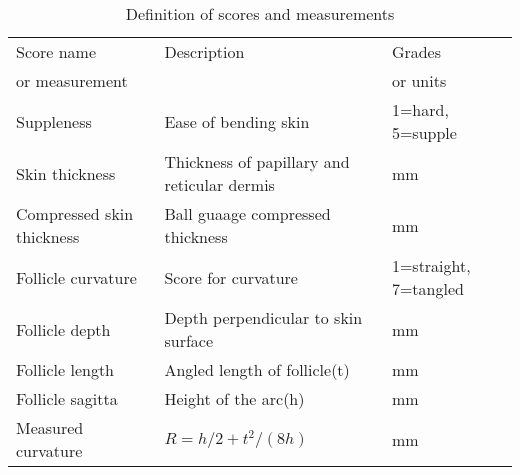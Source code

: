 %

\begin{table}[htp]
\centering
\caption{Definition of scores and measurements }
\label{tab:meas}
\vspace{0.1in}
\begin{tabular}{|p{1.0in}|p{2.5in}|p{0.9in}|}  \hline
     Score name & Description  & Grades  \\ 
  or measurement  &    & or units  \\ \hline
  Suppleness & Ease of bending skin & 1=hard, 5=supple \\
  Skin thickness & Thickness of papillary and reticular dermis & mm \\
  Compressed skin thickness & Ball guaage compressed thickness & mm \\
  Follicle curvature & Score for curvature & 1=straight, 7=tangled \\
  Follicle depth & Depth perpendicular to skin surface & mm \\
  Follicle length & Angled length of follicle(t) & mm \\
  Follicle sagitta & Height of the arc(h) & mm \\
  Measured curvature & $R = h/2 + t^2/(8h)$ & mm \\
\end{tabular}
\end{table}

%
